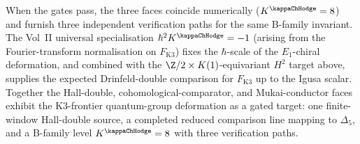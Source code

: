 \begin{remark}[Conditional $H^2$ comparator and the three faces of
$K^{\kappaChHodge} = 8$]
\begin{enumerate}[label=\textup{(F\arabic*)}, leftmargin=*]
\end{enumerate}
When the gates pass, the three faces coincide numerically
($K^{\kappaChHodge}=8$) and furnish three independent
verification paths for the same B-family invariant. The Vol~II
universal
specialisation $\hbar^2 K^{\kappaChHodge} = -1$
(arising from the Fourier-transform normalisation on
$F_{\mathrm{K3}}$) fixes the $\hbar$-scale of the
$E_1$-chiral deformation, and combined with the
$\Z/2 \times K(1)$-equivariant $H^2$ target above, supplies the
expected Drinfeld-double comparison for $F_{\mathrm{K3}}$ up to the
Igusa scalar. Together the Hall-double, cohomological-comparator, and
Mukai-conductor faces exhibit the K3-frontier quantum-group
deformation as a gated target: one finite-window Hall-double source, a
completed reduced comparison line mapping to $\Delta_5$, and a
B-family level $K^{\kappaChHodge}=8$ with three verification
paths.
\end{remark}

